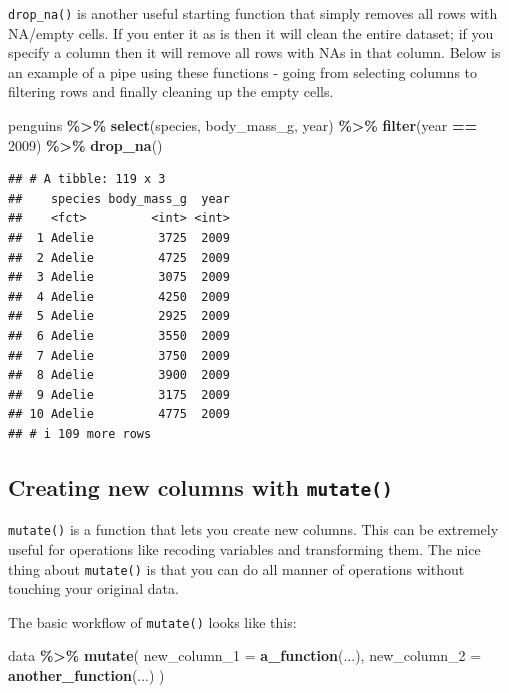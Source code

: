 \documentclass[
]{book}
\newenvironment{Shaded}{\begin{snugshade}}{\end{snugshade}}
\newcommand{\AttributeTok}[1]{\textcolor[rgb]{0.13,0.29,0.53}{#1}}
\newcommand{\DecValTok}[1]{\textcolor[rgb]{0.00,0.00,0.81}{#1}}
\newcommand{\FunctionTok}[1]{\textcolor[rgb]{0.13,0.29,0.53}{\textbf{#1}}}
\newcommand{\NormalTok}[1]{#1}
\newcommand{\SpecialCharTok}[1]{\textcolor[rgb]{0.81,0.36,0.00}{\textbf{#1}}}
\begin{document}
\texttt{drop\_na()} is another useful starting function that simply removes all rows with NA/empty cells. If you enter it as is then it will clean the entire dataset; if you specify a column then it will remove all rows with NAs in that column. Below is an example of a pipe using these functions - going from selecting columns to filtering rows and finally cleaning up the empty cells.

\begin{Shaded}
\begin{Highlighting}[]
\NormalTok{penguins }\SpecialCharTok{\%\textgreater{}\%}
  \FunctionTok{select}\NormalTok{(species, body\_mass\_g, year) }\SpecialCharTok{\%\textgreater{}\%}
  \FunctionTok{filter}\NormalTok{(year }\SpecialCharTok{==} \DecValTok{2009}\NormalTok{) }\SpecialCharTok{\%\textgreater{}\%}
  \FunctionTok{drop\_na}\NormalTok{()}
\end{Highlighting}
\end{Shaded}

\begin{verbatim}
## # A tibble: 119 x 3
##    species body_mass_g  year
##    <fct>         <int> <int>
##  1 Adelie         3725  2009
##  2 Adelie         4725  2009
##  3 Adelie         3075  2009
##  4 Adelie         4250  2009
##  5 Adelie         2925  2009
##  6 Adelie         3550  2009
##  7 Adelie         3750  2009
##  8 Adelie         3900  2009
##  9 Adelie         3175  2009
## 10 Adelie         4775  2009
## # i 109 more rows
\end{verbatim}

\subsection{\texorpdfstring{Creating new columns with \texttt{mutate()}}{Creating new columns with mutate()}}\label{creating-new-columns-with-mutate}

\texttt{mutate()} is a function that lets you create new columns. This can be extremely useful for operations like recoding variables and transforming them. The nice thing about \texttt{mutate()} is that you can do all manner of operations without touching your original data.

The basic workflow of \texttt{mutate()} looks like this:

\begin{Shaded}
\begin{Highlighting}[]
\NormalTok{data }\SpecialCharTok{\%\textgreater{}\%}
  \FunctionTok{mutate}\NormalTok{(}
    \AttributeTok{new\_column\_1 =} \FunctionTok{a\_function}\NormalTok{(...),}
    \AttributeTok{new\_column\_2 =} \FunctionTok{another\_function}\NormalTok{(...)}
\NormalTok{    )}
\end{Highlighting}
\end{Shaded}
\end{document}

